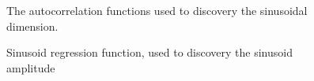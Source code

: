 \documentclass[conference]{IEEEtran}
\begin{document}
   \begin{figure}
	\centering
	\caption{The autocorrelation functions used to discovery the sinusoidal dimension.}%
  
	\caption{Sinusoid regression function, used to discovery the sinusoid amplitude}%
   \end{figure}
\end{document}
